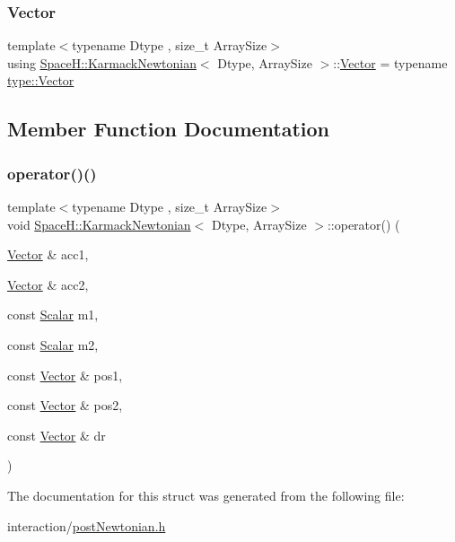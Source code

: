 \subsubsection{\texorpdfstring{Vector}{Vector}}
{\footnotesize\ttfamily template$<$typename Dtype , size\+\_\+t Array\+Size$>$ \\
using \mbox{\hyperlink{struct_space_h_1_1_karmack_newtonian}{Space\+H\+::\+Karmack\+Newtonian}}$<$ Dtype, Array\+Size $>$\+::\mbox{\hyperlink{struct_space_h_1_1_karmack_newtonian_a7c009d5759bb0bb17376432619394e4f}{Vector}} =  typename \mbox{\hyperlink{struct_space_h_1_1_proto_type_a316b81f4660b2b4fab14a8e1f23b6089}{type\+::\+Vector}}}



\subsection{Member Function Documentation}
\mbox{\label{struct_space_h_1_1_karmack_newtonian_af941c7ffd20d15e5f7fbbdde88a617c2}} 
\subsubsection{\texorpdfstring{operator()()}{operator()()}}
{\footnotesize\ttfamily template$<$typename Dtype , size\+\_\+t Array\+Size$>$ \\
void \mbox{\hyperlink{struct_space_h_1_1_karmack_newtonian}{Space\+H\+::\+Karmack\+Newtonian}}$<$ Dtype, Array\+Size $>$\+::operator() (\begin{DoxyParamCaption}\item[{\mbox{\hyperlink{struct_space_h_1_1_karmack_newtonian_a7c009d5759bb0bb17376432619394e4f}{Vector}} \&}]{acc1,  }\item[{\mbox{\hyperlink{struct_space_h_1_1_karmack_newtonian_a7c009d5759bb0bb17376432619394e4f}{Vector}} \&}]{acc2,  }\item[{const \mbox{\hyperlink{struct_space_h_1_1_karmack_newtonian_ae3b4407bf4803cf861b7bdf0d117c4bb}{Scalar}}}]{m1,  }\item[{const \mbox{\hyperlink{struct_space_h_1_1_karmack_newtonian_ae3b4407bf4803cf861b7bdf0d117c4bb}{Scalar}}}]{m2,  }\item[{const \mbox{\hyperlink{struct_space_h_1_1_karmack_newtonian_a7c009d5759bb0bb17376432619394e4f}{Vector}} \&}]{pos1,  }\item[{const \mbox{\hyperlink{struct_space_h_1_1_karmack_newtonian_a7c009d5759bb0bb17376432619394e4f}{Vector}} \&}]{pos2,  }\item[{const \mbox{\hyperlink{struct_space_h_1_1_karmack_newtonian_a7c009d5759bb0bb17376432619394e4f}{Vector}} \&}]{dr }\end{DoxyParamCaption})\hspace{0.3cm}{\ttfamily [inline]}}



The documentation for this struct was generated from the following file\+:\begin{DoxyCompactItemize}
\item 
interaction/\mbox{\hyperlink{post_newtonian_8h}{post\+Newtonian.\+h}}\end{DoxyCompactItemize}

